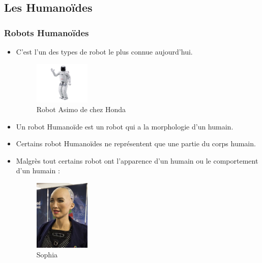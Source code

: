 \documentclass{beamer}
\begin{document}
\subsection{Les Humanoïdes}
\begin{frame}
\frametitle{Robots Humanoïdes}
\begin{itemize}
    \item C'est l'un des types de robot le plus connue aujourd'hui.
    \begin{figure}
        \centering
        \includegraphics[width=100]{img/asimo.png}
        \caption{Robot Asimo de chez Honda}
        \label{fig:my_label}
    \end{figure}
    \item Un robot Humanoïde est un robot qui a la morphologie d'un humain. 
    \item Certains robot Humanoïdes ne représentent que une partie du corps humain. 
\end{itemize}
\end{frame}
\begin{frame}
\begin{itemize}
    \item Malgrès tout certains robot ont l'apparence d'un humain ou le comportement d'un humain :
    \begin{figure}
        \centering
        \includegraphics[width=100]{img/sophia.png}
        \caption{Sophia}
        \label{fig:my_label}
    \end{figure}
    
\end{itemize}
    
\end{frame}
\end{document}
